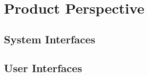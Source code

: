 \documentclass{scrreprt}
\begin{document}



\section{Product Perspective}

\subsection{System Interfaces}


\subsection{User Interfaces}

\end{document}
